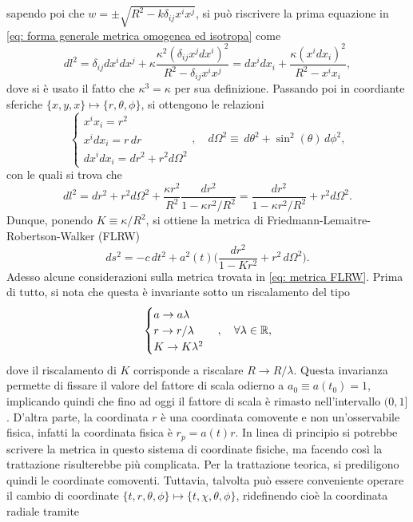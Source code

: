 sapendo poi che $w = \pm\sqrt{R^2 - k\delta_{ij}x^ix^j}$, si può riscrivere la prima equazione in \eqref{eq: forma generale metrica omogenea ed isotropa} come 
\begin{equation}
    dl^2 = \delta_{ij}dx^idx^j + \kappa\frac{\kappa^2(\delta_{ij}x^jdx^i)^2}{R^2 - \delta_{ij}x^ix^j} = dx^idx_i + \frac{\kappa(x^idx_i)^2}{R^2 - x^ix_i},
\end{equation}
dove si è usato il fatto che $\kappa^3 = \kappa$ per sua definizione. Passando poi in coordiante sferiche $\{x,y,x\} \mapsto \{r,\theta,\phi\}$, si ottengono le relazioni
\begin{equation}
    \begin{cases}
        x^ix_i = r^2 \\
        x^idx_i = r\,dr \\
        dx^idx_i = dr^2 + r^2d\Omega^2
    \end{cases},\quad d\Omega^2 \equiv \,d\theta^2 + \sin^2{(\theta)}\,d\phi^2,
\end{equation}
con le quali si trova che
\begin{equation}
    dl^2 = dr^2 + r^2d\Omega^2 + \frac{\kappa r^2}{R^2}\frac{dr^2}{1 - \kappa r^2/R^2} = \frac{dr^2}{1 - \kappa r^2/R^2} + r^2d\Omega^2.
\end{equation}
Dunque, ponendo $K \equiv \kappa/R^2$, si ottiene la metrica di Friedmann-Lemaitre-Robertson-Walker (FLRW)
\begin{equation}
\label{eq: metrica FLRW}
    ds^2 = -c\,dt^2 + a^2(t)\bigg(\frac{dr^2}{1 - Kr^2} + r^2\,d\Omega^2\bigg).
\end{equation}
Adesso alcune considerazioni sulla metrica trovata in \eqref{eq: metrica FLRW}. Prima di tutto, si nota che questa è invariante sotto un riscalamento del tipo
\begin{equation}
    \begin{cases}
        a \to a\lambda \\
        r \to r/\lambda \\
        K \to K\lambda^2
    \end{cases},\quad \forall \lambda \in \mathbb{R},
\end{equation}
dove il riscalamento di $K$ corrisponde a riscalare $R \to R/\lambda$. Questa invarianza permette di fissare il valore del fattore di scala odierno a $a_0 \equiv a(t_0) = 1$, implicando quindi che fino ad oggi il fattore di scala è rimasto nell'intervallo $(0,1]$. D'altra parte, la coordinata $r$ è una coordinata comovente e non un'osservabile fisica, infatti la coordinata fisica è $r_p = a(t)r$. In linea di principio si potrebbe scrivere la metrica in questo sistema di coordinate fisiche, ma facendo così la trattazione risulterebbe più complicata. Per la trattazione teorica, si prediligono quindi le coordinate comoventi. Tuttavia, talvolta può essere conveniente operare il cambio di coordinate $\{t,r,\theta,\phi\} \mapsto \{t,\chi,\theta,\phi\}$, ridefinendo cioè la coordinata radiale tramite 
